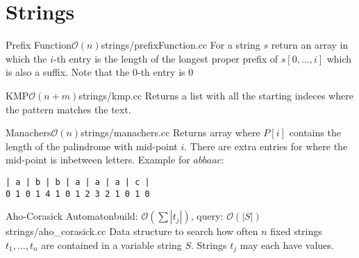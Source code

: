 \section{Strings}

\begin{code}{Prefix Function}{$\mathcal{O}(n)$}{strings/prefixFunction.cc}
  For a string $s$ return an array in which the $i$-th entry is the
  length of the longest proper prefix of $s[0,\ldots, i]$ which is also
  a suffix.  Note that the $0$-th entry is $0$
\end{code}

\begin{code}{KMP}{$\mathcal{O}(n + m)$}{strings/kmp.cc}
  Returns a list with all the starting indeces where the pattern matches
  the text.
\end{code}

\begin{code}{Manachers}{$\mathcal{O}(n)$}{strings/manachers.cc}
Returns array where $P[i]$ contains the length of the palindrome with
mid-point $i$. There are extra entries for where the mid-point is
inbetween letters. Example for $abbaac$:
\begin{verbatim}
| a | b | b | a | a | a | c |
0 1 0 1 4 1 0 1 2 3 2 1 0 1 0
\end{verbatim}
\end{code}

\begin{code}{Aho-Corasick Automaton}{build: $\mathcal{O}(\sum |t_j|)$, query: $\mathcal{O}(|S|)$}{strings/aho_corasick.cc}
  Data structure to search how often $n$ fixed strings $t_1, \dots, t_n$
  are contained in a variable string $S$. Strings $t_j$ may each have
  values.
\end{code}